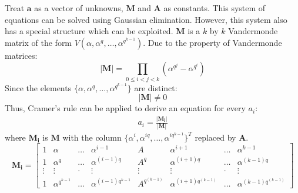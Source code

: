 Treat $\mathbf{a}$ as a vector of unknowns, $\mathbf{M}$ and $\mathbf{A}$ as constants. 
This system of equations can be solved using Gaussian 
elimination. However, this system also has a special structure which can
be exploited. $\mathbf{M}$ is a $k$ by $k$ Vandermonde matrix of the form 
$V(\alpha,\alpha^q,\dots,\alpha^{q^{k-1}})$.
Due to the property of Vandermonde matrices:
\begin{equation}
|\mathbf{M}| = \prod\limits_{0\leq i < j < k}(\alpha^{q^j} - \alpha^{q^i})
\end{equation}
Since the elements $\{\alpha,\alpha^q,\dots,\alpha^{q^{k-1}}\}$ are distinct:
\begin{equation}
|\mathbf{M}| \neq 0
\end{equation}
Thus, Cramer's rule can be applied to derive 
an equation for every $a_i$:
\begin{eqnarray}
a_i = \frac{|\mathbf{M_i}|}{|\mathbf{M}|} \label{eqn:cramerformFq}%
\end{eqnarray}
where $\mathbf{M_i}$ is $\mathbf{M}$ with the column $\{\alpha^i,\alpha^{iq},\dots,\alpha^{iq^{k-1}}\}^T$ 
replaced by $\mathbf{A}$.
\begin{equation}
\mathbf{M_i} = \begin{bmatrix}
1      &   \alpha            & \dots  & \alpha^{i-1}          & A           & \alpha^{i+1}              & \dots & \alpha^{k-1} \\
1      &   \alpha^q         & \dots  & \alpha^{(i-1)q}       & A^q         & \alpha^{(i+1)q}       & \dots & \alpha^{(k-1)q} \\
\vdots & \vdots             & \cdot  & \vdots                & \vdots      & \vdots                & \cdot & \vdots \\
1      &   \alpha^{q^{k-1}} & \dots  & \alpha^{(i-1)q^{k-1}} & A^{q^(k-1)} & \alpha^{(i+1)q^(k-1)} & \dots & \alpha^{(k-1)q^(k-1)}
\end{bmatrix}
\end{equation}

